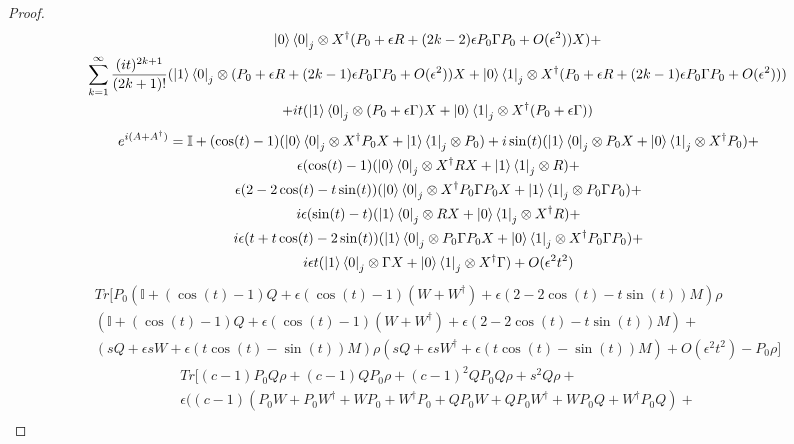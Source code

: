 \documentclass[10pt]{amsart}
\begin{document}
\begin{proof}
\begin{multline}
        \ket{0}\bra{0}_j\otimes X^{\dagger}(P_0 + \epsilon R + (2k-2)\epsilon P_0 \Gamma P_0 + O(\epsilon^2)) X)+\\
        \sum_{k=1}^{\infty} \frac{(it)^{2k+1}}{(2k+1)!}(\ket{1}\bra{0}_j\otimes (P_0 + \epsilon R + (2k-1)\epsilon P_0 \Gamma P_0 + O(\epsilon^2))X + \ket{0}\bra{1}_j\otimes X^{\dagger}(P_0 + \epsilon R + (2k-1)\epsilon P_0 \Gamma P_0 + O(\epsilon^2))) \\
        +it(\ket{1}\bra{0}_j\otimes (P_0 + \epsilon\Gamma)X + \ket{0}\bra{1}_j\otimes X^{\dagger}(P_0 + \epsilon\Gamma))
    \end{multline}
    \begin{multline}
        e^{i(A+A^{\dagger})} = \mathbb{I} + (\cos(t)-1)(\ket{0}\bra{0}_j\otimes X^{\dagger}P_0 X + \ket{1}\bra{1}_j\otimes P_0) + i \sin(t) (\ket{1}\bra{0}_j \otimes P_0 X + \ket{0}\bra{1}_j \otimes X^{\dagger}P_0) + \\
        \epsilon(\cos(t)-1)(\ket{0}\bra{0}_j\otimes X^{\dagger}R X + \ket{1}\bra{1}_j\otimes R) + \\
        \epsilon(2 - 2 \cos(t) - t \sin(t))(\ket{0}\bra{0}_j\otimes X^{\dagger}P_0\Gamma P_0 X + \ket{1}\bra{1}_j\otimes P_0\Gamma P_0) + \\
        i\epsilon(\sin(t) -t)(\ket{1}\bra{0}_j \otimes R X + \ket{0}\bra{1}_j \otimes X^{\dagger}R) + \\
        i\epsilon (t + t \cos(t) - 2 \sin(t))(\ket{1}\bra{0}_j \otimes P_0\Gamma P_0 X + \ket{0}\bra{1}_j \otimes X^{\dagger}P_0\Gamma P_0) + \\
        i\epsilon t (\ket{1}\bra{0}_j \otimes \Gamma  X + \ket{0}\bra{1}_j \otimes X^{\dagger}\Gamma ) + O(\epsilon^2 t^2)
    \end{multline}
    \begin{multline}
        Tr[P_0(\mathbb{I} + (\cos(t) -1)Q + \epsilon(\cos (t) -1)(W + W^{\dagger}) + \epsilon(2 - 2\cos(t) - t\sin(t))M)\rho\\(\mathbb{I} + (\cos(t) -1)Q + \epsilon(\cos (t) -1)(W + W^{\dagger}) + \epsilon(2 - 2\cos(t) - t\sin(t))M) +\\ (sQ + \epsilon sW + \epsilon (t\cos(t) - \sin(t))M)\rho(sQ + \epsilon sW^{\dagger} + \epsilon (t\cos(t) - \sin(t))M) + O(\epsilon^2t^2)  - P_0\rho ]
    \end{multline}
        \begin{multline}
        Tr[(c-1)P_0 Q \rho + (c-1) QP_0 \rho + (c-1)^2 QP_0Q\rho + s^2 Q\rho +\\
        \epsilon( (c-1)(P_0 W + P_0 W^{\dagger} + W P_0 + W^{\dagger} P_0 + Q P_0 W + Q P_0 W^{\dagger} + WP_0 Q + W^{\dagger}P_0 Q) +\\ 

\end{multline}
\end{proof}
\end{document}
